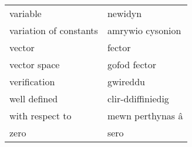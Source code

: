 \begin{supertabular}{p{0.22\textwidth}p{0.22\textwidth}}
                        variable &                         newidyn \\
          variation of constants &                amrywio cysonion \\
                          vector &                          fector \\
                    vector space &                    gofod fector \\
                    verification &                        gwireddu \\
                    well defined &               clir-ddiffiniedig \\
                 with respect to &                mewn perthynas â \\
                            zero &                            sero \\
\end{supertabular}
